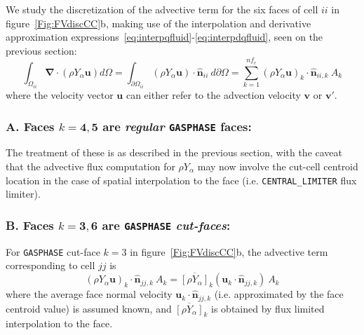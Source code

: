 \documentclass[12pt]{article}
\begin{document}
We study the discretization of the advective term for the six faces of cell $ii$ in figure~\ref{Fig:FVdiscCC}b, making use of the interpolation and derivative approximation expressions~\eqref{eq:interpqfluid}-\eqref{eq:interpdqfluid}, seen on the previous section:
%
\begin{equation}
  \int_{\Omega_{ii}} { \boldsymbol{\nabla} \cdot  \left(  \rho Y_\alpha \mathbf{u} \right) } d \Omega =
  \int_{\partial \Omega_{ii}} { \left( \rho Y_\alpha \mathbf{u} \right) \cdot \hat{\mathbf{n}}_{ii} } \: d \partial \Omega =
  \sum^{nf_c}_{k=1} \left( \rho Y_\alpha \mathbf{u} \right)_k \cdot \hat{\mathbf{n}}_{ii,k} \: A_k \label{eq:fvadv}
\end{equation}
%
where the velocity vector $\mathbf{u}$ can either refer to the advection velocity $\mathbf{v}$ or $\mathbf{v}'$.

\subsubsection*{A. Faces $k=\mathbf{4},\mathbf{5}$ are \textit{regular} \texttt{GASPHASE} faces:}
The treatment of these is as described in the previous section, with the caveat that the advective flux computation for $\rho Y_\alpha$ may now involve the cut-cell centroid location in the case of spatial interpolation to the face (i.e. \texttt{CENTRAL\_LIMITER} flux limiter).

\subsubsection*{B. Faces $k=\mathbf{3},\mathbf{6}$ are \texttt{GASPHASE} \textit{cut-faces}:}

For \texttt{GASPHASE} cut-face $k=3$ in figure~\ref{Fig:FVdiscCC}b, the advective term corresponding to cell $jj$ is
%
\begin{equation}
  \left( \rho Y_\alpha \mathbf{u} \right)_k \cdot \hat{\mathbf{n}}_{jj,k} \: A_k = \overline{[\rho Y_\alpha]}_k \left( \mathbf{u}_k \cdot \hat{\mathbf{n}}_{jj,k} \right) \: A_k \label{eq:convgcutface}
\end{equation}
%
where the average face normal velocity $\mathbf{u}_k \cdot \hat{\mathbf{n}}_{jj,k} $ (i.e. approximated by the face centroid value) is assumed known, and $\overline{[\rho Y_\alpha]}_k$ is obtained by flux limited interpolation to the face.
\end{document}
